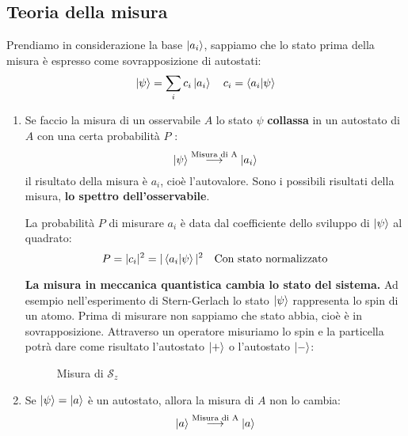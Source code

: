 \documentclass[a4paper]{article}
\begin{document}
\subsection{Teoria della misura}
Prendiamo in considerazione la base \( \ket{a_i} \), sappiamo che lo stato prima della
misura è espresso come sovrapposizione di autostati:
\[
  \ket{\psi} = \sum_i c_i \ket{a_i} \quad c_i = \braket{a_i}{\psi}
\] 
\begin{enumerate}
  \item Se faccio la misura di un osservabile \( A \) lo stato \( \psi \) \textbf{collassa}
    in un autostato di \( A \) con una certa probabilità \( P \) :
    \[
      \ket{\psi} \stackrel{\text{Misura di A}}{\longrightarrow} \ket{a_i}
    \] 
    il risultato della misura è \( a_i \), cioè l'autovalore. Sono i possibili
    risultati della misura, \textbf{lo spettro dell'osservabile}.

    \vspace{1em}
    \noindent
    La probabilità \( P \) di misurare \( a_i \) è data dal coefficiente dello sviluppo
    di \( \ket{\psi } \) al quadrato:
    \[
      P = |c_i|^2 = |\braket{a_i}{\psi}|^2 \quad \text{Con stato normalizzato}
    \]

    \vspace{1em}
    \noindent
    \textbf{La misura in meccanica quantistica cambia lo stato del sistema.} Ad
    esempio nell'esperimento di Stern-Gerlach lo stato \( \ket{\psi } \) rappresenta
    lo spin di un atomo. Prima di misurare non sappiamo che stato abbia, cioè è in
    sovrapposizione. Attraverso un operatore misuriamo lo spin e la particella
    potrà dare come risultato l'autostato \( \ket{+} \) o l'autostato \( \ket{-} \):
    \begin{figure}[H]
      \centering
      \caption{Misura di \( \mathcal{S}_z \)}
    \end{figure}

  \item Se \( \ket{\psi } = \ket{a} \) è un autostato, allora la misura di \( A \) non lo cambia:
    \[
      \ket{a} \stackrel{\text{Misura di A}}{\longrightarrow} \ket{a}
    \] 


\end{enumerate}
\end{document}
